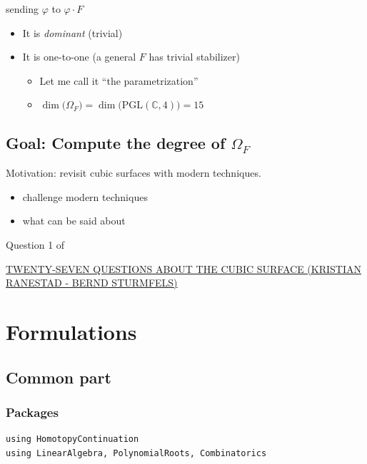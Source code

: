 \documentclass[11pt]{article}
\begin{document}
sending \(\varphi\) to \(\varphi\cdot F\)

\begin{itemize}
\item It is \emph{dominant} (trivial)

\item It is one-to-one (a general \(F\) has trivial stabilizer)

\begin{itemize}
\item Let me call it ``the parametrization''

\item \(\dim\big(\Omega_{F}\big) = \dim \big(\mathrm{PGL}(\mathbb{C},4)\big) = 15\)
\end{itemize}
\end{itemize}
\subsection{Goal: Compute the degree of \(\Omega_{F}\)}
\label{sec:orga595550}
Motivation: revisit cubic surfaces with modern techniques.
\begin{itemize}
\item challenge modern techniques
\item what can be said about
\end{itemize}

Question 1 of

\href{https://lematematiche.dmi.unict.it/index.php/lematematiche/issue/view/82}{TWENTY-SEVEN QUESTIONS ABOUT THE CUBIC SURFACE (KRISTIAN RANESTAD - BERND STURMFELS)}

\section{Formulations}
\label{sec:orgef81a00}
\subsection{Common part}
\label{sec:orgf6a1ed9}
\subsubsection{Packages}
\label{sec:orgf95c055}

\begin{verbatim}
using HomotopyContinuation
using LinearAlgebra, PolynomialRoots, Combinatorics
\end{verbatim}
\end{document}
